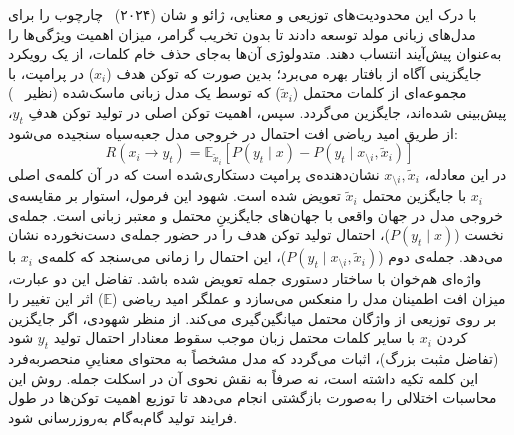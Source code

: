 با درک این محدودیت‌های توزیعی و معنایی، ژائو و شان (۲۰۲۴)~\cite{zhao2024reagent} چارچوب  را برای مدل‌های زبانی مولد توسعه دادند تا بدون تخریب گرامر، میزان اهمیت ویژگی‌ها را به‌عنوان پیش‌آیند انتساب دهند. متدولوژی آن‌ها به‌جای حذف خام کلمات، از یک رویکرد جایگزینی آگاه از بافتار بهره می‌برد؛ بدین صورت که توکن هدف ($x_i$) در پرامپت، با مجموعه‌ای از کلمات محتمل ($\tilde{x}_i$) که توسط یک مدل زبانی ماسک‌شده (نظیر ~\cite{liu2021roberta}) پیش‌بینی شده‌اند، جایگزین می‌گردد. سپس، اهمیت توکن اصلی در تولید توکن هدفِ $y_t$، از طریق امید ریاضی افت احتمال در خروجی مدل جعبه‌سیاه سنجیده می‌شود:
\begin{equation}\label{eq:chap3_reagent}
    R(x_i \rightarrow y_t) = \mathbb{E}_{\tilde{x}_i} \left[ P(y_t \mid x) - P(y_t \mid x_{\setminus i}, \tilde{x}_i) \right]
\end{equation}
در این معادله، $x_{\setminus i}, \tilde{x}_i$ نشان‌دهنده‌ی پرامپت دستکاری‌شده است که در آن کلمه‌ی اصلی $x_i$ با جایگزین محتمل $\tilde{x}_i$ تعویض شده است.
شهود این فرمول، استوار بر مقایسه‌ی خروجی مدل در جهان واقعی با جهان‌های جایگزینِ محتمل و معتبر زبانی است. جمله‌ی نخست ($P(y_t \mid x)$)، احتمال تولید توکن هدف را در حضور جمله‌ی دست‌نخورده نشان می‌دهد. جمله‌ی دوم ($P(y_t \mid x_{\setminus i}, \tilde{x}_i)$)، این احتمال را زمانی می‌سنجد که کلمه‌ی $x_i$ با واژه‌ای هم‌خوان با ساختار دستوری جمله تعویض شده باشد. تفاضل این دو عبارت، میزان افت اطمینان مدل را منعکس می‌سازد و عملگر امید ریاضی ($\mathbb{E}$) اثر این تغییر را بر روی توزیعی از واژگان محتمل میانگین‌گیری می‌کند. از منظر شهودی، اگر جایگزین کردن $x_i$ با سایر کلمات محتمل زبان موجب سقوط معنادار احتمال تولید $y_t$ شود (تفاضل مثبت بزرگ)، اثبات می‌گردد که مدل مشخصاً به محتوای معناییِ منحصربه‌فرد این کلمه تکیه داشته است، نه صرفاً به نقش نحوی آن در اسکلت جمله. روش  این محاسبات اختلالی را به‌صورت بازگشتی انجام می‌دهد تا توزیع اهمیت توکن‌ها در طول فرایند تولید گام‌به‌گام به‌روزرسانی شود.

